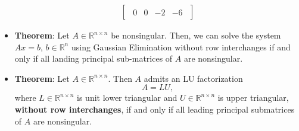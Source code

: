 \documentclass{report}
\begin{document}
\begin{itemize}
\begin{align*}
\begin{bmatrix}
\begin{array}{ccc|c}
                    0 & 0 & -2 & -6
                \end{array}
            \end{bmatrix}
        \end{align*}
    \item \textbf{Theorem}: Let $A \in \mathbb{R}^{n\times n}$ be nonsingular. Then, we can solve the system $Ax = b$, $b \in \mathbb{R}^{n}$ using Gaussian Elimination without row interchanges if and only if all landing principal sub-matrices of $A$ are nonsingular.
    \item \textbf{Theorem}: Let $A \in \mathbb{R}^{n \times n}$. Then $A$ admits an LU factorization
            \[
                A = LU,
            \]
            where $L \in \mathbb{R}^{n \times n}$ is unit lower triangular and 
            $U \in \mathbb{R}^{n \times n}$ is upper triangular, 
            \textbf{without row interchanges}, if and only if all leading principal 
            submatrices of $A$ are nonsingular.


\end{itemize}
\end{document}
